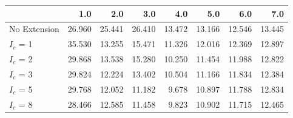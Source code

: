 \begin{tabular}{lrrrrrrr}
\toprule
{} &    1.0 &    2.0 &    3.0 &    4.0 &    5.0 &    6.0 &    7.0 \\
\midrule
No Extension & 26.960 & 25.441 & 26.410 & 13.472 & 13.166 & 12.546 & 13.445 \\
$I_c$ = 1    & 35.530 & 13.255 & 15.471 & 11.326 & 12.016 & 12.369 & 12.897 \\
$I_c$ = 2    & 29.868 & 13.538 & 15.280 & 10.250 & 11.454 & 11.988 & 12.822 \\
$I_c$ = 3    & 29.824 & 12.224 & 13.402 & 10.504 & 11.166 & 11.834 & 12.384 \\
$I_c$ = 5    & 29.768 & 12.052 & 11.182 &  9.678 & 10.897 & 11.788 & 12.834 \\
$I_c$ = 8    & 28.466 & 12.585 & 11.458 &  9.823 & 10.902 & 11.715 & 12.465 \\
\bottomrule
\end{tabular}
